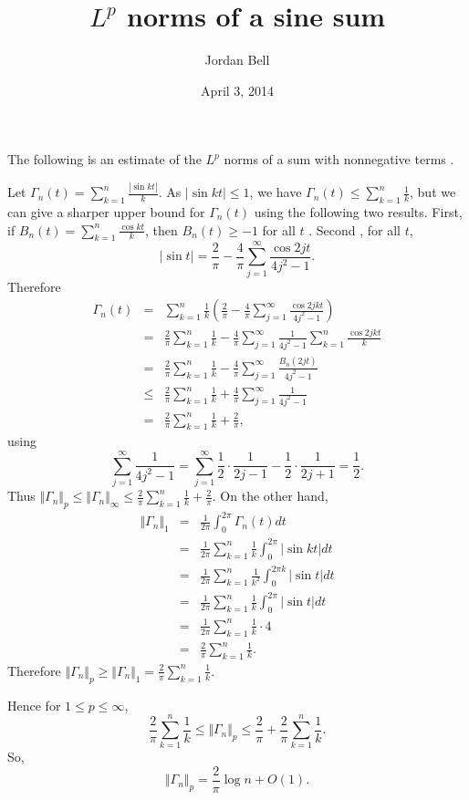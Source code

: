 \documentclass{article}
\newcommand{\norm}[1]{\Vert #1 \Vert}
\begin{document}
\title{$L^p$ norms of a sine sum}
\author{Jordan Bell}
\date{April 3, 2014}
\maketitle

The following is an estimate of the $L^p$ norms of a sum with nonnegative terms \cite[p.~77, no.~38]{polya}.

Let $\Gamma_n(t)=\sum_{k=1}^n \frac{|\sin kt|}{k}$. As $|\sin kt| \leq 1$, we have $\Gamma_n(t) \leq \sum_{k=1}^n \frac{1}{k}$, but we can
give a sharper upper bound for $\Gamma_n(t)$ using the following two results.
First, if $B_n(t)=\sum_{k=1}^n \frac{\cos kt}{k}$, then $B_n(t) \geq  -1$ for all $t$ \cite[p.~75, no.~28]{polya}.
Second  \cite[p.~76, no.~34]{polya}, for all $t$,
\[
|\sin t|=\frac{2}{\pi}-\frac{4}{\pi}\sum_{j=1}^\infty \frac{\cos 2jt}{4j^2-1}.
\]
Therefore
\begin{eqnarray*}
\Gamma_n(t)&=&\sum_{k=1}^n \frac{1}{k} \left( \frac{2}{\pi}-\frac{4}{\pi} \sum_{j=1}^\infty \frac{\cos 2jkt}{4j^2-1} \right)\\
&=&\frac{2}{\pi}\sum_{k=1}^n \frac{1}{k}-\frac{4}{\pi}\sum_{j=1}^\infty \frac{1}{4j^2-1} \sum_{k=1}^n \frac{\cos 2jkt}{k}\\
&=&\frac{2}{\pi}\sum_{k=1}^n \frac{1}{k}-\frac{4}{\pi}\sum_{j=1}^\infty \frac{B_n(2jt)}{4j^2-1}\\
&\leq&\frac{2}{\pi}\sum_{k=1}^n \frac{1}{k}+\frac{4}{\pi}\sum_{j=1}^\infty \frac{1}{4j^2-1}\\
&=&\frac{2}{\pi}\sum_{k=1}^n \frac{1}{k}+\frac{2}{\pi},
\end{eqnarray*}
using 
\[
\sum_{j=1}^\infty \frac{1}{4j^2-1}=
\sum_{j=1}^\infty \frac{1}{2}\cdot \frac{1}{2j-1}-\frac{1}{2}\cdot \frac{1}{2j+1} 
=
\frac{1}{2}.
\]
Thus $\norm{\Gamma_n}_p \leq \norm{\Gamma_n}_\infty \leq \frac{2}{\pi}\sum_{k=1}^n \frac{1}{k}+\frac{2}{\pi}$.
On the other hand, 
\begin{eqnarray*}
\norm{\Gamma_n}_1&=&\frac{1}{2\pi}\int_0^{2\pi} \Gamma_n(t) dt\\
&=&\frac{1}{2\pi} \sum_{k=1}^n \frac{1}{k} \int_0^{2\pi} |\sin kt| dt\\
&=&\frac{1}{2\pi} \sum_{k=1}^n \frac{1}{k^2} \int_0^{2\pi k} |\sin t| dt\\
&=&\frac{1}{2\pi} \sum_{k=1}^n \frac{1}{k} \int_0^{2\pi} |\sin t| dt\\
&=&\frac{1}{2\pi} \sum_{k=1}^n \frac{1}{k} \cdot 4\\
&=&\frac{2}{\pi}\sum_{k=1}^n \frac{1}{k}. 
\end{eqnarray*}
Therefore $\norm{\Gamma_n}_p \geq \norm{\Gamma_n}_1= \frac{2}{\pi}\sum_{k=1}^n \frac{1}{k}$.

Hence for $1 \leq p \leq \infty$,
\[
 \frac{2}{\pi}\sum_{k=1}^n \frac{1}{k} \leq \norm{\Gamma_n}_p \leq \frac{2}{\pi}+ \frac{2}{\pi}\sum_{k=1}^n \frac{1}{k}.
\]
So,
\[
\norm{\Gamma_n}_p = \frac{2}{\pi} \log n + O(1).
\]



\end{document}
